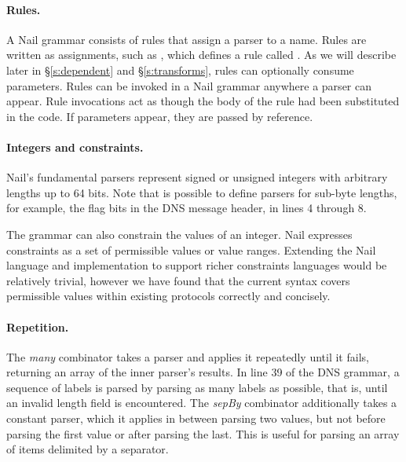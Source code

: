 
\paragraph{Rules.}
A Nail grammar consists of rules that assign a parser to a name. Rules are written as assignments,
such as , which defines a rule called . As we will
describe later in \S\ref{s:dependent} and \S\ref{s:transforms}, rules can optionally consume parameters.
Rules can be invoked in a Nail grammar anywhere a parser can appear. Rule invocations act as though
the body of the rule had been substituted in the code. If parameters appear, they are passed by
reference.
\paragraph{Integers and constraints.}

Nail's fundamental parsers represent signed or unsigned
integers with arbitrary lengths up to 64 bits.
Note that is possible to define parsers for sub-byte lengths, for example, the flag bits in the DNS
message header, in lines 4 through 8.

The grammar can also constrain the values of an integer.  Nail expresses
constraints as a set of permissible values or value ranges. Extending the Nail language and
implementation to support richer constraints languages would be relatively trivial, however we have
found that the current syntax covers permissible values within existing protocols correctly and
concisely.


\paragraph{Repetition.}

The \emph{many} combinator takes a parser and applies it repeatedly
until it fails, returning an array of the inner parser's results. In line 39 of the DNS grammar, a
sequence of labels is parsed by parsing as many labels as possible, that is, until an invalid length
field is encountered.
The \emph{sepBy} combinator
additionally takes a constant parser, which it applies in between parsing
two values, but not before parsing the first value or after parsing the
last.  This is useful for parsing an array of items delimited by a separator.

